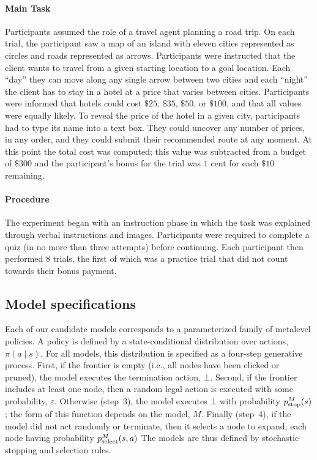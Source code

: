 \paragraph{Main Task}
Participants assumed the role of a travel agent planning a road trip. On each trial, the participant saw a map of an island with eleven cities represented as circles and roads represented as arrows. Participants were instructed that the client wants to travel from a given starting location to a goal location. Each ``day'' they can move along any single arrow between two cities and each ``night'' the client has to stay in a hotel at a price that varies between cities. Participants were informed that hotels could cost $\$25$, $\$35$, $\$50$, or $\$100$, and that all values were equally likely. To reveal the price of the hotel in a given city, participants had to type its name into a text box. They could uncover any number of prices, in any order, and they could submit their recommended route at any moment. At this point the total cost was computed; this value was subtracted from a budget of $\$300$ and the participant's bonus for the trial was $1$ cent for each $\$10$ remaining.

\paragraph{Procedure}
The experiment began with an instruction phase in which the task was explained through verbal instructions and images. Participants were required to complete a quiz (in no more than three attempts) before continuing.
Each participant then performed $8$ trials, the first of which was a practice trial that did not count towards their bonus payment.


\subsection{Model specifications}\label{sec:planning-modelspec}
Each of our candidate models corresponds to a parameterized family of metalevel policies. A policy is defined by a state-conditional distribution over actions, $\pi(a \mid s)$. For all models, this distribution is specified as a four-step generative process. First, if the frontier is empty (i.e., all nodes have been clicked or pruned), the model executes the termination action, $\bot$. Second, if the frontier includes at least one node, then a random legal action is executed with some probability, $\varepsilon$. Otherwise (step~3), the model executes $\bot$ with probability $p_{\mathrm{stop}}^M(s)$; the form of this function depends on the model, $M$. Finally (step~4), if the model did not act randomly or terminate, then it selects a node to expand, each node having probability $p_{\mathrm{select}}^M(s, a)$ The models are thus defined by stochastic stopping and selection rules.


